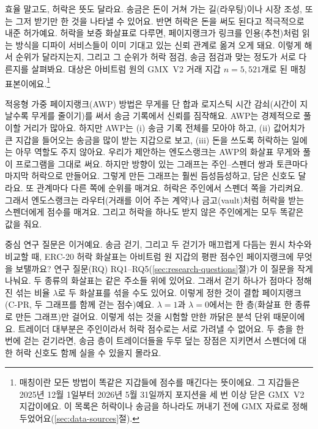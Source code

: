 효율 말고도, 허락은 뜻도 달라요. 송금은 돈이 거쳐 가는 길(라우팅)이나 시장 조성, 또는 그저 받기만 한 것을 나타낼 수 있어요. 반면 허락은 돈을 써도 된다고 적극적으로 내준 허가예요. 허락을 보증 화살표로 다루면, 페이지랭크가 링크를 인용(추천)처럼 읽는 방식을 디파이 서비스들이 이미 기대고 있는 신뢰 관계로 옮겨 오게 돼요. 이렇게 해서 순위가 달라지는지, 그리고 그 순위가 허락 점검, 송금 점검과 맞는 정도가 서로 다른지를 살펴봐요. 대상은 아비트럼 원의 GMX~V2 거래 지갑 $n=5{,}521$개로 된 매칭 표본이에요.\footnote{매칭이란 모든 방법이 똑같은 지갑들에 점수를 매긴다는 뜻이에요. 그 지갑들은 2025년 12월 1일부터 2026년 5월 31일까지 포지션을 세 번 이상 닫은 GMX~V2 지갑이에요. 이 목록은 허락이나 송금을 하나라도 꺼내기 전에 GMX 자료로 정해 두었어요(\ref{sec:data-sources}절).}


적응형 가중 페이지랭크(AWP) 방법은 무게를 단 합과 로지스틱 시간 감쇠(시간이 지날수록 무게를 줄이기)를 써서 송금 기록에서 신뢰를 짐작해요. AWP는 경제적으로 풀이할 거리가 많아요. 하지만 AWP는 (i) 송금 기록 전체를 모아야 하고, (ii) 값어치가 큰 지갑을 들어오는 송금을 많이 받는 지갑으로 보고, (iii) 돈을 쓰도록 허락하는 일에는 아무 역할도 주지 않아요. 우리가 제안하는 엔도스랭크는 AWP의 화살표 무게와 풀이 프로그램을 그대로 써요. 하지만 방향이 있는 그래프는 주인--스펜더 쌍과 토큰마다 마지막 허락으로 만들어요. 그렇게 만든 그래프는 훨씬 듬성듬성하고, 담은 신호도 달라요. 또 관계마다 다른 쪽에 순위를 매겨요. 허락은 주인에서 스펜더 쪽을 가리켜요. 그래서 엔도스랭크는 라우터(거래를 이어 주는 계약)나 금고(vault)처럼 허락을 받는 스펜더에게 점수를 매겨요. 그리고 허락을 하나도 받지 않은 주인에게는 모두 똑같은 값을 줘요.

중심 연구 질문은 이거예요. 송금 걷기, 그리고 두 걷기가 매끄럽게 다듬는 원시 차수와 비교할 때, ERC-20 허락 화살표는 아비트럼 원 지갑의 평판 점수인 페이지랭크에 무엇을 보탤까요? 연구 질문(RQ) RQ1--RQ5(\ref{sec:research-questions}절)가 이 질문을 작게 나눠요. 두 종류의 화살표는 같은 주소들 위에 있어요. 그래서 걷기 하나가 점마다 정해진 섞는 비율 $\lambda$로 두 화살표를 섞을 수도 있어요. 이렇게 정한 것이 결합 페이지랭크(C-PR, 두 그래프를 함께 걷는 점수)예요. $\lambda=1$과 $\lambda=0$에서는 한 층(화살표 한 종류로 만든 그래프)만 걸어요. 이렇게 섞는 것을 시험할 만한 까닭은 분석 단위 때문이에요. 트레이더 대부분은 주인이라서 허락 점수로는 서로 가려낼 수 없어요. 두 층을 한 번에 걷는 걷기라면, 송금 층이 트레이더들을 두루 덮는 장점은 지키면서 스펜더에 대한 허락 신호도 함께 실을 수 있을지 몰라요.

